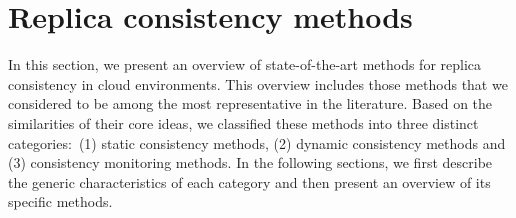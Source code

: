 \section{Replica consistency methods}

In this section, we present an overview of state-of-the-art methods for replica consistency in cloud environments. This overview includes those methods that we considered to be among the most representative in the literature.
Based on the similarities of their core ideas, we classified these %
methods into three distinct categories:~(1) static consistency methods, (2) dynamic consistency methods and (3) consistency monitoring methods. In the following sections, we first describe the generic characteristics of each category and then present an overview of its specific methods.

